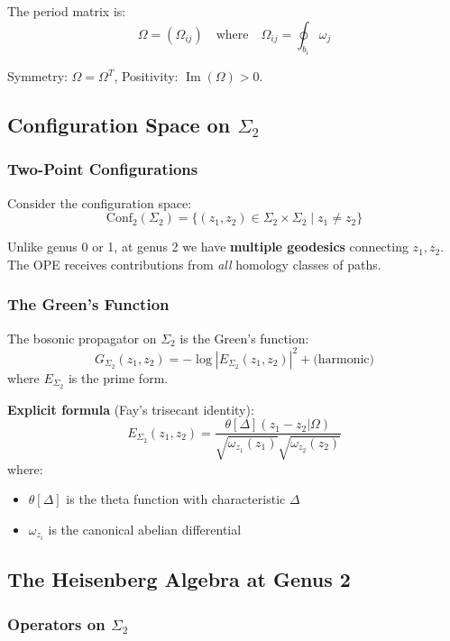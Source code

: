 The period matrix is:
$$\Omega = (\Omega_{ij}) \quad \text{where} \quad \Omega_{ij} = \oint_{b_i} \omega_j$$

Symmetry: $\Omega = \Omega^T$, Positivity: $\operatorname{Im}(\Omega) > 0$.

\subsection{Configuration Space on $\Sigma_2$}

\subsubsection{Two-Point Configurations}

Consider the configuration space:
$$\mathrm{Conf}_2(\Sigma_2) = \{(z_1, z_2) \in \Sigma_2 \times \Sigma_2 \mid z_1 \neq z_2 \}$$

Unlike genus 0 or 1, at genus 2 we have \textbf{multiple geodesics} connecting $z_1, z_2$.
The OPE receives contributions from \emph{all} homology classes of paths.

\subsubsection{The Green's Function}

The bosonic propagator on $\Sigma_2$ is the Green's function:
$$G_{\Sigma_2}(z_1, z_2) = -\log|E_{\Sigma_2}(z_1, z_2)|^2 + \text{(harmonic)}$$
where $E_{\Sigma_2}$ is the prime form.

\textbf{Explicit formula} (Fay's trisecant identity):
$$E_{\Sigma_2}(z_1, z_2) = \frac{\theta[\Delta](z_1 - z_2 | \Omega)}
{\sqrt{\omega_{z_1}(z_1)} \sqrt{\omega_{z_2}(z_2)}}$$
where:
\begin{itemize}
\item $\theta[\Delta]$ is the theta function with characteristic $\Delta$
\item $\omega_{z_i}$ is the canonical abelian differential
\end{itemize}

\subsection{The Heisenberg Algebra at Genus 2}

\subsubsection{Operators on $\Sigma_2$}

